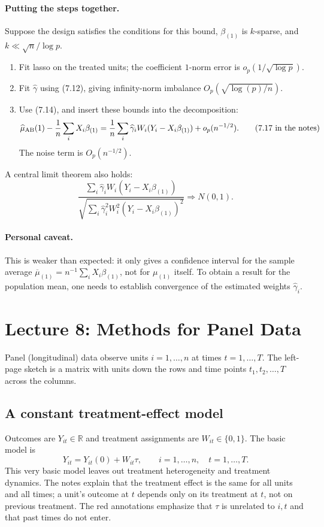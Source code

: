 \paragraph{Putting the steps together.}
Suppose the design satisfies the conditions for this bound, $\beta_{(1)}$ is $k$-sparse, and $k\ll\sqrt n/\log p$.
\begin{enumerate}
\item Fit lasso on the treated units; the coefficient $1$-norm error is $o_p(1/\sqrt{\log p})$.
\item Fit $\widehat\gamma$ using (7.12), giving infinity-norm imbalance $O_p(\sqrt{\log(p)/n})$.
\item Use (7.14), and insert these bounds into the decomposition:
\[
\widehat\mu_{\rm AB}(1)-\frac1n\sum_iX_i\beta_{(1)}
=\frac1n\sum_i\widehat\gamma_iW_i(Y_i-X_i\beta_{(1)})+o_p(n^{-1/2}).
\tag{7.17 in the notes}
\]
The noise term is $O_p(n^{-1/2})$.
\end{enumerate}
A central limit theorem also holds:
\[
\frac{\sum_i\widehat\gamma_iW_i(Y_i-X_i\beta_{(1)})}
{\sqrt{\sum_i\widehat\gamma_i^2W_i^2(Y_i-X_i\beta_{(1)})^2}}
\Rightarrow N(0,1).
\]
\paragraph{Personal caveat.}
This is weaker than expected: it only gives a confidence interval for the sample average
$\overline\mu_{(1)}=n^{-1}\sum_iX_i\beta_{(1)}$, not for $\mu_{(1)}$ itself. To obtain a result for the population mean, one needs to establish convergence of the estimated weights $\widehat\gamma_i$.

\section{Lecture 8: Methods for Panel Data}
Panel (longitudinal) data observe units $i=1,\ldots,n$ at times $t=1,\ldots,T$. The left-page sketch is a matrix with units down the rows and time points $t_1,t_2,\ldots,T$ across the columns.
\subsection{A constant treatment-effect model}
Outcomes are $Y_{it}\in\mathbb R$ and treatment assignments are $W_{it}\in\{0,1\}$. The basic model is
\[
Y_{it}=Y_{it}(0)+W_{it}\tau,\qquad i=1,\ldots,n,\quad t=1,\ldots,T.
\tag{8.1 in the notes}
\]
This very basic model leaves out treatment heterogeneity and treatment dynamics. The notes explain that the treatment effect is the same for all units and all times; a unit's outcome at $t$ depends only on its treatment at $t$, not on previous treatment. The red annotations emphasize that $\tau$ is unrelated to $i,t$ and that past times do not enter.
